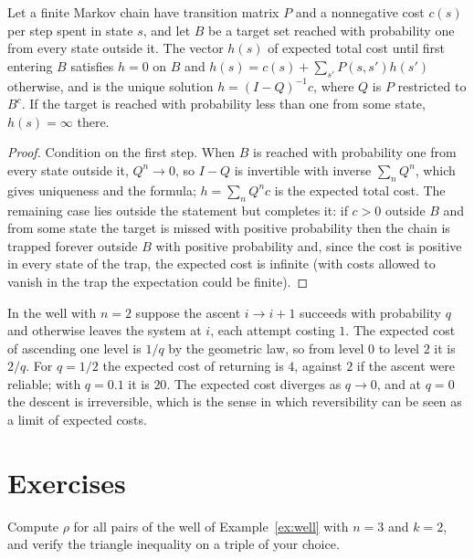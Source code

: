 \begin{newresult}\label{prop:expected-return}
Let a finite Markov chain have transition matrix $P$ and a nonnegative cost $c(s)$ per step spent in state $s$, and let $B$ be a target set reached with probability one from every state outside it. The vector $h(s)$ of expected total cost until first entering $B$ satisfies $h=0$ on $B$ and $h(s)=c(s)+\sum_{s'}P(s,s')h(s')$ otherwise, and is the unique solution $h=(I-Q)^{-1}c$, where $Q$ is $P$ restricted to $B^c$. If the target is reached with probability less than one from some state, $h(s)=\infty$ there.
\end{newresult}
\begin{proof}
Condition on the first step. When $B$ is reached with probability one from every state outside it, $Q^n\to0$, so $I-Q$ is invertible with inverse $\sum_nQ^n$, which gives uniqueness and the formula; $h=\sum_nQ^nc$ is the expected total cost. The remaining case lies outside the statement but completes it: if $c>0$ outside $B$ and from some state the target is missed with positive probability then the chain is trapped forever outside $B$ with positive probability and, since the cost is positive in every state of the trap, the expected cost is infinite (with costs allowed to vanish in the trap the expectation could be finite).
\end{proof}

\begin{example}\label{ex:unreliable-ascent}
In the well with $n=2$ suppose the ascent $i\to i+1$ succeeds with probability $q$ and otherwise leaves the system at $i$, each attempt costing $1$. The expected cost of ascending one level is $1/q$ by the geometric law, so from level $0$ to level $2$ it is $2/q$. For $q=1/2$ the expected cost of returning is $4$, against $2$ if the ascent were reliable; with $q=0.1$ it is $20$. The expected cost diverges as $q\to0$, and at $q=0$ the descent is irreversible, which is the sense in which reversibility can be seen as a limit of expected costs.
\end{example}

\section*{Exercises}

\begin{exercise}
Compute $\rho$ for all pairs of the well of Example~\ref{ex:well} with $n=3$ and $k=2$, and verify the triangle inequality on a triple of your choice.
\end{exercise}

